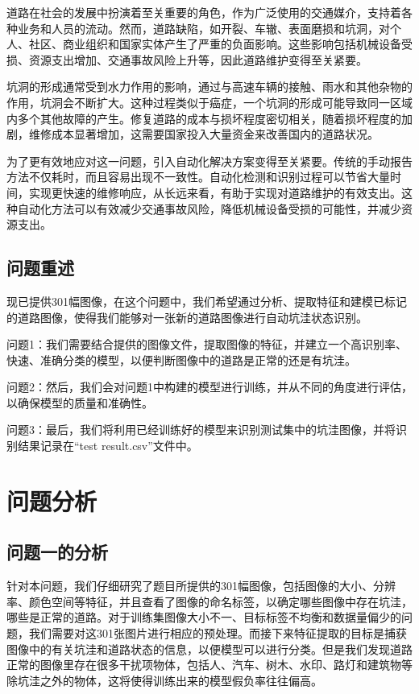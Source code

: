 \documentclass[a4paper, 10pt]{article}
\begin{document}
	道路在社会的发展中扮演着至关重要的角色，作为广泛使用的交通媒介，支持着各种业务和人员的流动。然而，道路缺陷，如开裂、车辙、表面磨损和坑洞，对个人、社区、商业组织和国家实体产生了严重的负面影响。这些影响包括机械设备受损、资源支出增加、交通事故风险上升等，因此道路维护变得至关紧要。
	
	坑洞的形成通常受到水力作用的影响，通过与高速车辆的接触、雨水和其他杂物的作用，坑洞会不断扩大。这种过程类似于癌症，一个坑洞的形成可能导致同一区域内多个其他故障的产生。修复道路的成本与损坏程度密切相关，随着损坏程度的加剧，维修成本显著增加，这需要国家投入大量资金来改善国内的道路状况。
	
	为了更有效地应对这一问题，引入自动化解决方案变得至关紧要。传统的手动报告方法不仅耗时，而且容易出现不一致性。自动化检测和识别过程可以节省大量时间，实现更快速的维修响应，从长远来看，有助于实现对道路维护的有效支出。这种自动化方法可以有效减少交通事故风险，降低机械设备受损的可能性，并减少资源支出。
	
	\subsection{问题重述}
	现已提供301幅图像，在这个问题中，我们希望通过分析、提取特征和建模已标记的道路图像，使得我们能够对一张新的道路图像进行自动坑洼状态识别。
	
	问题1：我们需要结合提供的图像文件，提取图像的特征，并建立一个高识别率、快速、准确分类的模型，以便判断图像中的道路是正常的还是有坑洼。
	
	问题2：然后，我们会对问题1中构建的模型进行训练，并从不同的角度进行评估，以确保模型的质量和准确性。
	
	问题3：最后，我们将利用已经训练好的模型来识别测试集中的坑洼图像，并将识别结果记录在“test result.csv”文件中。
	
	\section{问题分析}
	
	\subsection{问题一的分析}
	
	针对本问题，我们仔细研究了题目所提供的301幅图像，包括图像的大小、分辨率、颜色空间等特征，并且查看了图像的命名标签，以确定哪些图像中存在坑洼，哪些是正常的道路。对于训练集图像大小不一、目标标签不均衡和数据量偏少的问题，我们需要对这301张图片进行相应的预处理。而接下来特征提取的目标是捕获图像中的有关坑洼和道路状态的信息，以便模型可以进行分类。但是我们发现道路正常的图像里存在很多干扰项物体，包括人、汽车、树木、水印、路灯和建筑物等除坑洼之外的物体，这将使得训练出来的模型假负率往往偏高。
	
\end{document}
